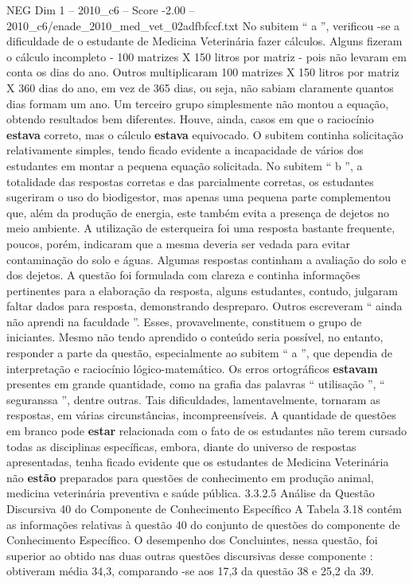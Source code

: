 \begin{textsample}{NEG Dim 1 – 2010\_c6 – Score -2.00 – 2010\_c6/enade\_2010\_med\_vet\_02adfbfccf.txt}
No subitem “ a ”, verificou -se a dificuldade de o estudante de Medicina Veterinária fazer cálculos.
Alguns fizeram o cálculo incompleto - 100 matrizes X 150 litros por matriz - pois não levaram em conta os dias do ano.
Outros multiplicaram 100 matrizes X 150 litros por matriz X 360 dias do ano, em vez de 365 dias, ou seja, não sabiam claramente quantos dias formam um ano.
Um terceiro grupo simplesmente não montou a equação, obtendo resultados bem diferentes.
Houve, ainda, casos em que o raciocínio \textbf{estava} correto, mas o cálculo \textbf{estava} equivocado.
O subitem continha solicitação relativamente simples, tendo ficado evidente a incapacidade de vários dos estudantes em montar a pequena equação solicitada.
No subitem “ b ”, a totalidade das respostas corretas e das parcialmente corretas, os estudantes sugeriram o uso do biodigestor, mas apenas uma pequena parte complementou que, além da produção de energia, este também evita a presença de dejetos no meio ambiente.
A utilização de esterqueira foi uma resposta bastante frequente, poucos, porém, indicaram que a mesma deveria ser vedada para evitar contaminação do solo e águas.
Algumas respostas continham a avaliação do solo e dos dejetos.
A questão foi formulada com clareza e continha informações pertinentes para a elaboração da resposta, alguns estudantes, contudo, julgaram faltar dados para resposta, demonstrando despreparo.
Outros escreveram “ ainda não aprendi na faculdade ”.
Esses, provavelmente, constituem o grupo de iniciantes.
Mesmo não tendo aprendido o conteúdo seria possível, no entanto, responder a parte da questão, especialmente ao subitem “ a ”, que dependia de interpretação e raciocínio lógico-matemático.
Os erros ortográficos \textbf{estavam} presentes em grande quantidade, como na grafia das palavras “ utilisação ”, “ seguranssa ”, dentre outras.
Tais dificuldades, lamentavelmente, tornaram as respostas, em várias circunstâncias, incompreensíveis.
A quantidade de questões em branco pode \textbf{estar} relacionada com o fato de os estudantes não terem cursado todas as disciplinas específicas, embora, diante do universo de respostas apresentadas, tenha ficado evidente que os estudantes de Medicina Veterinária não \textbf{estão} preparados para questões de conhecimento em produção animal, medicina veterinária preventiva e saúde pública. 3.3.2.5 Análise da Questão Discursiva 40 do Componente de Conhecimento Específico A Tabela 3.18 contém as informações relativas à questão 40 do conjunto de questões do componente de Conhecimento Específico.
O desempenho dos Concluintes, nessa questão, foi superior ao obtido nas duas outras questões discursivas desse componente : obtiveram média 34,3, comparando -se aos 17,3 da questão 38 e 25,2 da 39.

\end{textsample}
